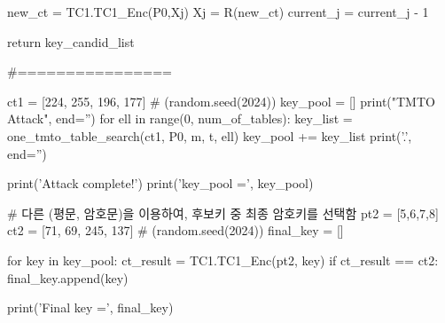 \begin{python}
      new_ct = TC1.TC1_Enc(P0,Xj)
      Xj = R(new_ct)
      current_j = current_j - 1

   return key_candid_list


#================

ct1 = [224, 255, 196, 177] # (random.seed(2024))
key_pool = []
print("TMTO Attack", end='')
for ell in range(0, num_of_tables):
   key_list = one_tmto_table_search(ct1, P0, m, t, ell)
   key_pool += key_list
   print('.', end='')

print('\n Attack complete!\n')
print('key_pool =', key_pool)

# 다른 (평문, 암호문)을 이용하여, 후보키 중 최종 암호키를 선택함
pt2 = [5,6,7,8]
ct2 = [71, 69, 245, 137] # (random.seed(2024))
final_key = []

for key in key_pool:
   ct_result = TC1.TC1_Enc(pt2, key)
   if ct_result == ct2:
   final_key.append(key)

print('Final key =', final_key)   
\end{python}
\newpage